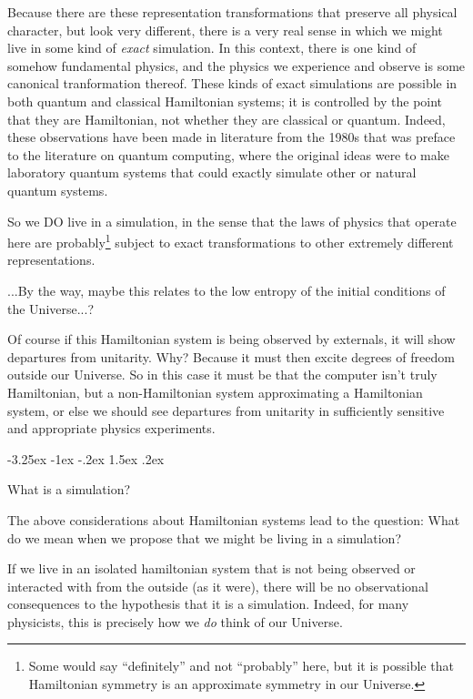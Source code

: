 \documentclass[12pt,letterpaper]{article}
\makeatletter
\renewcommand\section{\@startsection {section}{1}{\z@}%
  {-3.25ex \@plus -1ex \@minus -.2ex}%
  {1.5ex \@plus .2ex}%
  {\raggedright\normalfont\large\bfseries}}
\makeatother
\begin{document}
Because there are these representation transformations that preserve all physical character, but look very different, there is a very real sense in which we might live in some kind of \emph{exact} simulation.
In this context, there is one kind of somehow fundamental physics, and the physics we experience and observe is some canonical tranformation thereof.
These kinds of exact simulations are possible in both quantum and classical Hamiltonian systems; it is controlled by the point that they are Hamiltonian, not whether they are classical or quantum.
Indeed, these observations have been made in literature from the 1980s \cite{feynman, feynman2} that was preface to the literature on quantum computing, where the original ideas were to make laboratory quantum systems that could exactly simulate other or natural quantum systems.

So we DO live in a simulation, in the sense that the laws of physics that operate here are probably\footnote{Some would say ``definitely'' and not ``probably'' here, but it is possible that Hamiltonian symmetry is an approximate symmetry in our Universe.} subject to exact transformations to other extremely different representations.

...By the way, maybe this relates to the low entropy of the initial conditions of the Universe...?

Of course if this Hamiltonian system is being observed by externals, it will show departures from unitarity. Why? Because it must then excite degrees of freedom outside our Universe. So in this case it must be that the computer isn't truly Hamiltonian, but a non-Hamiltonian system approximating a Hamiltonian system, or else we should see departures from unitarity in sufficiently sensitive and appropriate physics experiments.

\section{What is a simulation?}\label{sec:definition}

The above considerations about Hamiltonian systems lead to the question: What do we mean when we propose that we might be living in a simulation?

If we live in an isolated hamiltonian system that is not being observed or interacted with from the outside (as it were), there will be no observational consequences to the hypothesis that it is a simulation.
Indeed, for many physicists, this is precisely how we \emph{do} think of our Universe.
\end{document}
